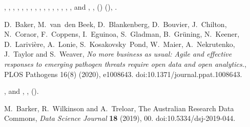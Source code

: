 \documentclass[ds,v1.1.2,openaccess]{iosart2x}%
\begin{document}
\begin{thebibliography}{}
%
\begin{barticle}
,
,
,
,
,
,
,
,
,
,
,
,
,
,
,
,
 and
,
,
()
(),
.
\end{barticle}
%
\OrigBibText
D.~Baker,
M.~van~den Beek,
D.~Blankenberg,
D.~Bouvier,
J.~Chilton,
N.~Coraor,
F.~Coppens,
I.~Eguinoa,
S.~Gladman,
B.~Gr\"{u}ning,
N.~Keener,
D.~Larivi\`{e}re,
A.~Lonie,
S.~Kosakovsky~Pond,
W.~Maier,
A.~Nekrutenko,
J.~Taylor and
S.~Weaver,
\textit{No more business as usual: Agile and effective responses to emerging
pathogen threats require open data and open analytics.},
{PLOS} Pathogens
16(8)
(2020),
e1008643.
doi:10.1371/journal.ppat.1008643.
\endOrigBibText
{}
\endbibitem

%
\begin{barticle}
,
 and
,
,
().
\end{barticle}
%
\OrigBibText
M.~Barker,
R.~Wilkinson and
A.~Treloar,
The Australian Research Data Commons,
\textit{Data Science Journal}
\textbf{18}
(2019), 00.
doi:10.5334/dsj-2019-044.
\endOrigBibText
{}
\endbibitem


\end{thebibliography}
\end{document}
